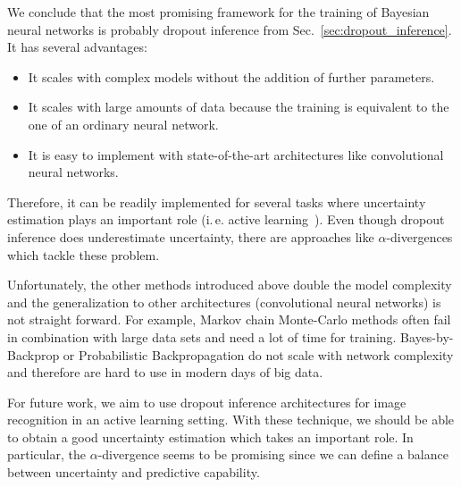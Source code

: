 \documentclass[runningheads]{llncs}
\begin{document}
We conclude that the most promising framework for the training of Bayesian neural networks is probably dropout inference from Sec.~\ref{sec:dropout_inference}.
It has several advantages: 
\begin{itemize}
    \item It scales with complex models without the addition of further parameters.
    \item It scales with large amounts of data because the training is equivalent to the one of an ordinary neural network.
    \item It is easy to implement with state-of-the-art architectures like convolutional neural networks.
\end{itemize}
Therefore, it can be readily implemented for several tasks where uncertainty estimation plays an important role (i.\,e. active learning~\cite{settles2009active}).
Even though dropout inference does underestimate uncertainty, there are approaches like $\alpha$-divergences which tackle these problem.

Unfortunately, the other methods introduced above double the model complexity and the generalization to other architectures (convolutional neural networks) is not straight forward. 
For example, Markov chain Monte-Carlo methods often fail in combination with large data sets and need a lot of time for training.
Bayes-by-Backprop or Probabilistic Backpropagation do not scale with network complexity and therefore are hard to use in modern days of big data.

For future work, we aim to use dropout inference architectures for image recognition in an active learning setting.
With these technique, we should be able to obtain a good uncertainty estimation which takes an important role.
In particular, the $\alpha$-divergence seems to be promising since we can define a balance between uncertainty and predictive capability.



\end{document}
